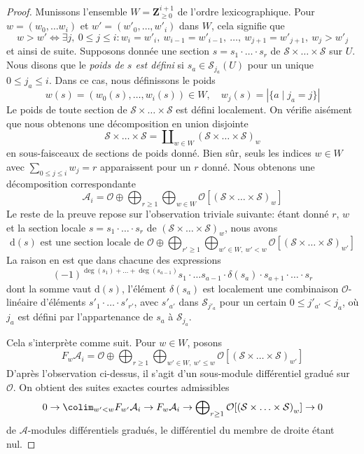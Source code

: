 \begin{proof}
\medskip\noindent
Munissons l'ensemble $W = \mathbf{Z}_{\geq 0}^{i + 1}$ de l'ordre lexicographique.
Pour $w = (w_0, \ldots w_i)$ et $w' = (w'_0, \ldots, w'_i)$ dans $W$, cela signifie que
$$
w > w' \Leftrightarrow
\exists j,\ 0 \leq j \leq i :
w_i = w'_i,\ w_{i - 1} = w'_{i - 1},\ \ldots ,
\ w_{j + 1} = w'_{j + 1},\ w_j > w'_j
$$
et ainsi de suite.
Supposons donnée une section $s = s_1 \cdot \ldots \cdot s_r$ de $\mathcal{S} \times \ldots \times \mathcal{S}$ sur $U$.
Nous disons que le {\it poids de $s$ est défini} si $s_a \in \mathcal{S}_{j_a}(U)$ pour un unique $0 \leq j_a \leq i$.
Dans ce cas, nous définissons le poids
$$
w(s) = (w_0(s), \ldots, w_i(s)) \in W,\quad
w_j(s) = |\{a \mid j_a = j\}|
$$
Le poids de toute section de $\mathcal{S} \times \ldots \times \mathcal{S}$ est défini localement.
On vérifie aisément que nous obtenons une décomposition en union disjointe
$$
\mathcal{S} \times \ldots \times \mathcal{S} =
\coprod\nolimits_{w \in W} \left(
\mathcal{S} \times \ldots \times \mathcal{S}\right)_w
$$
en sous-faisceaux de sections de poids donné.
Bien sûr, seuls les indices $w \in W$ avec $\sum_{0 \leq j \leq i} w_j = r$ apparaissent pour un $r$ donné.
Nous obtenons une décomposition correspondante
$$
\mathcal{A}_i = \mathcal{O} \oplus
\bigoplus\nolimits_{r \geq 1}
\bigoplus\nolimits_{w \in W}
\mathcal{O}[\left(\mathcal{S} \times \ldots \times \mathcal{S}\right)_w]
$$
Le reste de la preuve repose sur l'observation triviale suivante: étant donné $r$, $w$ et la section locale $s = s_1 \cdot \ldots \cdot s_r$ de $\left(\mathcal{S} \times \ldots \times \mathcal{S}\right)_w$, nous avons
$$
\text{d}(s) \text{ est une section locale de } \mathcal{O} \oplus
\bigoplus\nolimits_{r' \geq 1}
\bigoplus\nolimits_{w' \in W,\ w' < w}
\mathcal{O}[\left(\mathcal{S} \times \ldots \times \mathcal{S}\right)_{w'}]
$$
La raison en est que dans chacune des expressions
$$
(-1)^{\deg(s_1) + \ldots + \deg(s_{a - 1})}
s_1 \cdot \ldots s_{a - 1} \cdot \delta(s_a) \cdot
s_{a + 1} \cdot \ldots \cdot s_r
$$
dont la somme vaut $\text{d}(s)$, l'élément $\delta(s_a)$ est localement une combinaison $\mathcal{O}$-linéaire d'éléments $s'_1 \cdot \ldots \cdot s'_{r'}$, avec $s'_{a'}$ dans $\mathcal{S}_{j'_a}$ pour un certain $0 \leq j'_{a'} < j_a$, où $j_a$ est défini par l'appartenance de $s_a$ à $\mathcal{S}_{j_a}$.

\medskip\noindent
Cela s'interprète comme suit.
Pour $w \in W$, posons
$$
F_w \mathcal{A}_i = \mathcal{O} \oplus \bigoplus\nolimits_{r \geq 1}
\bigoplus\nolimits_{w' \in W,\ w' \leq w}
\mathcal{O}[\left(\mathcal{S} \times \ldots \times \mathcal{S}\right)_{w'}]
$$
D'après l'observation ci-dessus, il s'agit d'un sous-module différentiel gradué sur $\mathcal{O}$.
On obtient des suites exactes courtes admissibles
$$
0 \to \colim_{w' < w} F_{w'}\mathcal{A}_i \to
F_w\mathcal{A}_i \to
\bigoplus\nolimits_{r \geq 1}
\mathcal{O}[\left(\mathcal{S} \times \ldots \times \mathcal{S}\right)_w]
\to 0
$$
de $\mathcal{A}$-modules différentiels gradués, le différentiel du membre de droite étant nul.


\end{proof}
